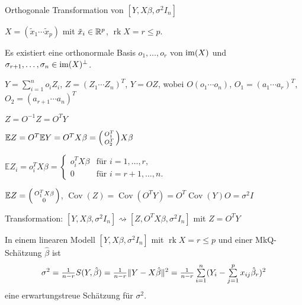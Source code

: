 \documentclass{cheat-sheet}
\newcommand{\E}{\mathbb{E}} %
\DeclareMathOperator{\rk}{rk} %
\DeclareMathOperator{\cov}{Cov} %
\newcommand{\Normal}{\mathcal{N}} %
\begin{document}
Orthogonale Transformation von $[Y, X \beta, \sigma^2 I_n]$

$X = (\tilde{x}_1 \cdots \tilde{x}_p)$ mit $\tilde{x}_i \in \mathbb{R}^p$, $\rk X = r \leq p$.

Es existiert eine orthonormale Basis $o_1, \ldots, o_r$ von $\operatorname{im}(X)$ und $\sigma_{r+1}, \ldots, \sigma_n \in \operatorname{im}(X)^\perp$.

$Y = \sum_{i=1}^n o_i Z_i$, $Z = (Z_1 \cdots Z_n)^T$, \dh{} $Y = O Z$, wobei $O (o_1 \cdots o_n)$, $O_1 = (a_1 \cdots a_r)^T$, $O_2 = (a_{r+1} \cdots a_n)^T$

$Z = O^{-1} Z = O^T Y$

$\E Z = O^T \E Y = O^T X \beta = \begin{psmallmatrix}
  O_1^T \\ O_2^T
\end{psmallmatrix} X \beta$

$\E Z_i = o_i^T X \beta = \begin{cases}
  o_i^T X \beta & \text{für $i = 1, \ldots, r$,} \\
  0 & \text{für $i = r+1, \ldots, n$.}
\end{cases}$

$\E Z = \begin{psmallmatrix}
  O_1^T X \beta \\ 0
\end{psmallmatrix}$, $\cov(Z) = \cov(O^T Y) = O^T \cov(Y) O = \sigma^2 I$

Transformation: $[Y, X \beta, \sigma^2 I_n] \rightsquigarrow [Z, O^T X \beta, \sigma^2 I_n]$ mit $Z = O^T Y$

\begin{satz}
  In einem linearen Modell $[Y, X \beta, \sigma^2 I_n]$ mit $\rk X = r \leq p$ und einer MkQ-Schätzung $\hat{\beta}$ ist
  \[ \sigma^2 = \tfrac{1}{n-r} S(Y, \hat{\beta}) = \tfrac{1}{n-r} \norm{Y - X \hat\beta}^2 = \tfrac{1}{n-r} \sum_{i=1}^n (Y_i - \sum_{j=1}^p x_{ij} \hat\beta_r)^2 \]
  eine erwartungstreue Schätzung für $\sigma^2$.
\end{satz}


\end{document}
